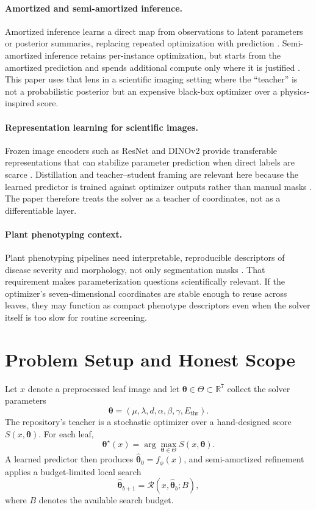\documentclass[11pt,a4paper]{article}
\newcommand{\R}{\mathbb{R}}
\newcommand{\thetao}{\boldsymbol{\theta}^{\star}}
\newcommand{\thetahat}{\hat{\boldsymbol{\theta}}}
\begin{document}
\paragraph{Amortized and semi-amortized inference.}
Amortized inference learns a direct map from observations to latent parameters or posterior summaries, replacing repeated optimization with prediction \citep{A_cranmer2020,A_radev2020,A_amos2023}.
Semi-amortized inference retains per-instance optimization, but starts from the amortized prediction and spends additional compute only where it is justified \citep{A_kim2018,A_marino2018}.
This paper uses that lens in a scientific imaging setting where the ``teacher'' is not a probabilistic posterior but an expensive black-box optimizer over a physics-inspired score.

\paragraph{Representation learning for scientific images.}
Frozen image encoders such as ResNet and DINOv2 provide transferable representations that can stabilize parameter prediction when direct labels are scarce \citep{A_he2016,A_oquab2024}.
Distillation and teacher--student framing are relevant here because the learned predictor is trained against optimizer outputs rather than manual masks \citep{A_hinton2015}.
The paper therefore treats the solver as a teacher of coordinates, not as a differentiable layer.

\paragraph{Plant phenotyping context.}
Plant phenotyping pipelines need interpretable, reproducible descriptors of disease severity and morphology, not only segmentation masks \citep{A_mahlein2016,A_mutka2015,A_ubbens2017}.
That requirement makes parameterization questions scientifically relevant.
If the optimizer's seven-dimensional coordinates are stable enough to reuse across leaves, they may function as compact phenotype descriptors even when the solver itself is too slow for routine screening.

\section{Problem Setup and Honest Scope}
Let $x$ denote a preprocessed leaf image and let $\boldsymbol{\theta}\in\Theta\subset\R^7$ collect the solver parameters
\[
\boldsymbol{\theta}=(\mu,\lambda,d,\alpha,\beta,\gamma,E_{\mathrm{thr}}).
\]
The repository's teacher is a stochastic optimizer over a hand-designed score $S(x,\boldsymbol{\theta})$.
For each leaf,
\begin{equation}
\thetao(x)=\arg\max_{\boldsymbol{\theta}\in\Theta} S(x,\boldsymbol{\theta}).
\label{eq:oracle}
\end{equation}
A learned predictor then produces $\thetahat_0=f_\phi(x)$, and semi-amortized refinement applies a budget-limited local search
\begin{equation}
\thetahat_{b+1}=\mathcal{R}(x,\thetahat_b;B),
\label{eq:refine}
\end{equation}
where $B$ denotes the available search budget.
\end{document}
